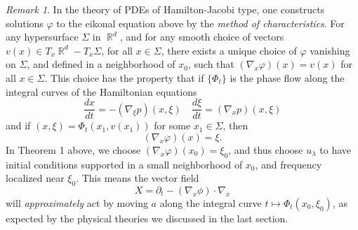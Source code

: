 \documentclass{article}
\theoremstyle{plain}
\theoremstyle{remark}
\newtheorem*{remark}{Remark}
\theoremstyle{definition}
\DeclareMathOperator{\RR}{\mathbb{R}}
\begin{document}
\begin{remark}
	In the theory of PDEs of Hamilton-Jacobi type, one constructs solutions $\varphi$ to the eikonal equation above by the \emph{method of characteristics}. For any hypersurface $\Sigma$ in $\RR^d$, and for any smooth choice of vectors $v(x) \in T_x \RR^d - T_x \Sigma$, for all $x \in \Sigma$, there exists a unique choice of $\varphi$ vanishing on $\Sigma$, and defined in a neighborhood of $x_0$, such that $(\nabla_x \varphi)(x) = v(x)$ for all $x \in \Sigma$. This choice has the property that if $\{ \Phi_t \}$ is the phase flow along the integral curves of the Hamiltonian equations
	\[ \frac{dx}{dt} = - (\nabla_\xi p)(x,\xi) \quad \frac{d\xi}{dt} = (\nabla_x p)(x,\xi) \]
	and if $(x,\xi) = \Phi_t(x_1,v(x_1))$ for some $x_1 \in \Sigma$, then
	\[ (\nabla_x \varphi)(x) = \xi. \]
	In Theorem 1 above, we choose $(\nabla_x \varphi)(x_0) = \xi_0$, and thus choose $u_\lambda$ to have initial conditions supported in a small neighborhood of $x_0$, and frequency localized near $\xi_0$. This means the vector field
	\[ X = \partial_t - (\nabla_x \phi) \cdot \nabla_x \]
	will \emph{approximately} act by moving $a$ along the integral curve $t \mapsto \Phi_t(x_0,\xi_0)$, as expected by the physical theories we discussed in the last section.
\end{remark}
\end{document}
